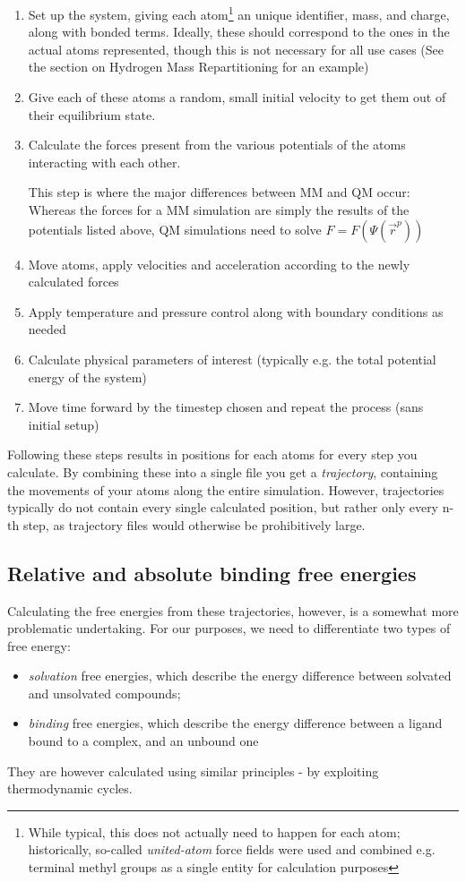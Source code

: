 \documentclass[oneside]{scrreprt}
\begin{document}
\begin{enumerate}
    \item Set up the system, giving each atom\footnote{While typical, this does not actually need to happen for each atom; historically, so-called \emph{united-atom} force fields were used and combined e.g. terminal methyl groups as a single entity for calculation purposes} an unique identifier, mass, and charge, along with bonded terms. Ideally, these should correspond to the ones in the actual atoms represented, though this is not necessary for all use cases (See the section on Hydrogen Mass Repartitioning for an example)
    \item Give each of these atoms a random, small initial velocity to get them out of their equilibrium state.
    \item Calculate the forces present from the various potentials of the atoms interacting with each other.
    
    This step is where the major differences between MM and QM occur: Whereas the forces for a MM simulation are simply the results of the potentials listed above, QM simulations need to solve $F=F(\Psi(\Vec{r}^p))$
    \item Move atoms, apply velocities and acceleration according to the newly calculated forces
    \item Apply temperature and pressure control along with boundary conditions as needed
    \item Calculate physical parameters of interest (typically e.g. the total potential energy of the system)
    \item Move time forward by the timestep chosen and repeat the process (sans initial setup)
\end{enumerate}

Following these steps results in positions for each atoms for every step you calculate. By combining these into a single file you get a \emph{trajectory}, containing the movements of your atoms along the entire simulation. However, trajectories typically do not contain every single calculated position, but rather only every n-th step, as trajectory files would otherwise be prohibitively large.

\subsection{Relative and absolute binding free energies}

Calculating the free energies from these trajectories, however, is a somewhat more problematic undertaking. For our purposes, we need to differentiate two types of free energy:
\begin{itemize}
    \item \emph{solvation} free energies, which describe the energy difference between solvated and unsolvated compounds;
    \item \emph{binding} free energies, which describe the energy difference between a ligand bound to a complex, and an unbound one
\end{itemize}
They are however calculated using similar principles - by exploiting thermodynamic cycles.
\end{document}
